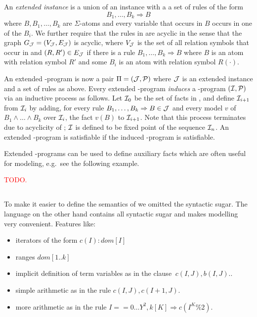 \documentclass[conference]{IEEEtran}
\begin{document}
An \emph{extended instance \Jmc} is a union of an instance \Imc with a
a set of rules of the form
%
\[B_1,\ldots,B_k\Rightarrow B\]
%
where $B,B_1,\ldots,B_k$ are $\Sigma$-atoms and every variable that
occurs in $B$ occurs in one of the $B_i$. We further require that the
rules in \Jmc are acyclic in the sense that the graph $G_\mathcal{J} = (V_\mathcal{J},E_\mathcal{J})$ is
acyclic, where $V_\mathcal{J}$ is the set of all relation symbols that occur in
\Jmc and $(R,R')\in E_\mathcal{J}$ if there is a rule
$B_1,\ldots,B_k\Rightarrow B$ where $B$ is an atom with relation
symbol $R'$ and some $B_i$ is an atom with relation symbol $R(\cdot)$.  

An extended \bcore-program is now a pair $\Pi=(\mathcal{J},\mathcal{P})$ where
$\mathcal{J}$ is an extended instance and \Pmc a set of rules as above. Every
extended \bcore-program \emph{induces} a \bcore-program $(\mathcal{I},\mathcal{P})$
via an inductive process as follows. Let $\mathcal{I}_0$ be the set of facts
in \Jmc, and define $\mathcal{I}_{i+1}$ from $\mathcal{I}_i$ by adding, for every
rule $B_1,\ldots,B_k\Rightarrow B\in \mathcal{J}$ and every model $v$ of
$B_1\wedge \ldots \wedge B_k$ over $\mathcal{I}_i$, the fact $v(B)$ to
$\mathcal{I}_{i+1}$. Note that this process terminates due to acyclicity of
\Jmc; $\mathcal{I}$ is defined to be fixed point of the sequence $\mathcal{I}_n$. An
extended \bcore-program is satisfiable if the induced \bcore-program
is satisfiable. 

Extended \bcore-programs can be used to define auxiliary facts which
are often useful for modeling, e.g.~see the following example. 
%
\begin{example}
  \textcolor{red}{TODO.}
\end{example}


\subsection{\bnice}

To make it easier to define the semantics of \bfull we omitted the syntactic sugar. 
The language \bnice on the other hand contains all syntactic sugar and makes modelling very convenient.  
Features like: 

\begin{itemize}
  \item iterators of the form $c(I):dom[I]$
  \item ranges $dom[1..k]$ 
  \item implicit definition of term variables as in the clause $~c(I,J),b(I,J).$.
  \item simple arithmetic as in the rule $c(I,J),c(I+1,J).$ 
  \item more arithmetic as in the rule $ I== 0 \ldots Y^2, k[K] \Rightarrow c(I^K\%2).$
\end{itemize}
\end{document}
